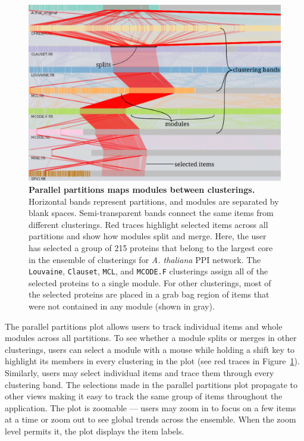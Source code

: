 \documentclass[12pt]{cmuthesis}
\newcommand{\Athal}{\textit{A. thaliana}\xspace}
\begin{document}
  \begin{figure}[htb!]
    \centering
    \includegraphics[width=\linewidth]{figures/coral_parsets}
    \caption{\textbf{Parallel partitions maps modules between clusterings.} Horizontal bands represent partitions, and modules are separated by blank spaces. Semi-transparent bands connect the same items from different
   clusterings. Red traces highlight selected items across all partitions and show how modules split and merge. Here, the user has selected a group of 215 proteins that belong to the largest core in the ensemble of clusterings for \Athal PPI network. The \texttt{Louvaine}, \texttt{Clauset}, \texttt{MCL}, and \texttt{MCODE.F} clusterings assign all of the selected proteins to a single
   module. For other clusterings, most of the selected proteins are placed in a
   grab bag region of items that were not contained in any module (shown in gray).}
    \label{fig:coral:parsets}
  \end{figure}

  The parallel partitions plot allows users to track individual items and whole modules across all partitions. To see whether a module splits or merges in other clusterings, users can select a module with a mouse while holding a shift key to highlight its members in every clustering in the plot (see red traces in Figure~\ref{fig:coral:parsets}). Similarly, users may select individual items and trace them through every clustering band. The selections made in the parallel partitions plot propagate to other views making it easy to track the same group of items throughout the application. The plot is zoomable --- users may zoom in to focus on a few items at a time or zoom out to see global trends across the ensemble. When the zoom level permits it, the plot displays the item labels.
\end{document}
